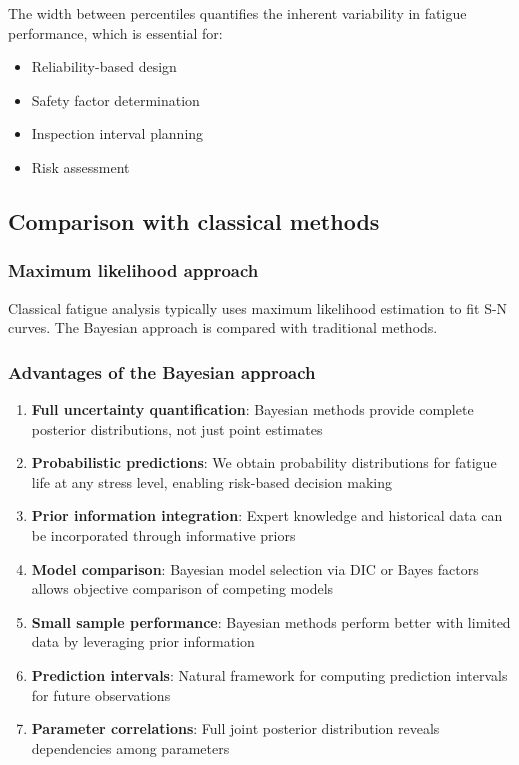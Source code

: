 The width between percentiles quantifies the inherent variability in fatigue performance, which is essential for:
\begin{itemize}
\item Reliability-based design
\item Safety factor determination
\item Inspection interval planning
\item Risk assessment
\end{itemize}

\subsection{Comparison with classical methods}

\subsubsection*{Maximum likelihood approach}

Classical fatigue analysis typically uses maximum likelihood estimation to fit S-N curves. The Bayesian approach is compared with traditional methods.

\subsubsection*{Advantages of the Bayesian approach}

\begin{enumerate}
\item \textbf{Full uncertainty quantification}: Bayesian methods provide complete posterior distributions, not just point estimates
\item \textbf{Probabilistic predictions}: We obtain probability distributions for fatigue life at any stress level, enabling risk-based decision making
\item \textbf{Prior information integration}: Expert knowledge and historical data can be incorporated through informative priors
\item \textbf{Model comparison}: Bayesian model selection via DIC or Bayes factors allows objective comparison of competing models
\item \textbf{Small sample performance}: Bayesian methods perform better with limited data by leveraging prior information
\item \textbf{Prediction intervals}: Natural framework for computing prediction intervals for future observations
\item \textbf{Parameter correlations}: Full joint posterior distribution reveals dependencies among parameters
\end{enumerate}


